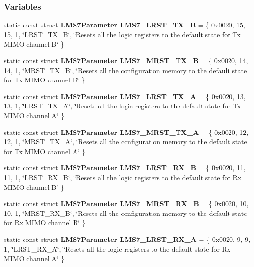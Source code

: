 \subsubsection*{Variables}
\begin{DoxyCompactItemize}
\item 
static const struct {\bf L\+M\+S7\+Parameter} {\bf L\+M\+S7\+\_\+\+L\+R\+S\+T\+\_\+\+T\+X\+\_\+B} = \{ 0x0020, 15, 15, 1, \char`\"{}\+L\+R\+S\+T\+\_\+\+T\+X\+\_\+\+B\char`\"{}, \char`\"{}\+Resets all the logic registers to the default state for Tx M\+I\+M\+O channel B\char`\"{} \}
\item 
static const struct {\bf L\+M\+S7\+Parameter} {\bf L\+M\+S7\+\_\+\+M\+R\+S\+T\+\_\+\+T\+X\+\_\+B} = \{ 0x0020, 14, 14, 1, \char`\"{}\+M\+R\+S\+T\+\_\+\+T\+X\+\_\+\+B\char`\"{}, \char`\"{}\+Resets all the configuration memory to the default state for Tx M\+I\+M\+O channel B\char`\"{} \}
\item 
static const struct {\bf L\+M\+S7\+Parameter} {\bf L\+M\+S7\+\_\+\+L\+R\+S\+T\+\_\+\+T\+X\+\_\+A} = \{ 0x0020, 13, 13, 1, \char`\"{}\+L\+R\+S\+T\+\_\+\+T\+X\+\_\+\+A\char`\"{}, \char`\"{}\+Resets all the logic registers to the default state for Tx M\+I\+M\+O channel A\char`\"{} \}
\item 
static const struct {\bf L\+M\+S7\+Parameter} {\bf L\+M\+S7\+\_\+\+M\+R\+S\+T\+\_\+\+T\+X\+\_\+A} = \{ 0x0020, 12, 12, 1, \char`\"{}\+M\+R\+S\+T\+\_\+\+T\+X\+\_\+\+A\char`\"{}, \char`\"{}\+Resets all the configuration memory to the default state for Tx M\+I\+M\+O channel A\char`\"{} \}
\item 
static const struct {\bf L\+M\+S7\+Parameter} {\bf L\+M\+S7\+\_\+\+L\+R\+S\+T\+\_\+\+R\+X\+\_\+B} = \{ 0x0020, 11, 11, 1, \char`\"{}\+L\+R\+S\+T\+\_\+\+R\+X\+\_\+\+B\char`\"{}, \char`\"{}\+Resets all the logic registers to the default state for Rx M\+I\+M\+O channel B\char`\"{} \}
\item 
static const struct {\bf L\+M\+S7\+Parameter} {\bf L\+M\+S7\+\_\+\+M\+R\+S\+T\+\_\+\+R\+X\+\_\+B} = \{ 0x0020, 10, 10, 1, \char`\"{}\+M\+R\+S\+T\+\_\+\+R\+X\+\_\+\+B\char`\"{}, \char`\"{}\+Resets all the configuration memory to the default state for Rx M\+I\+M\+O channel B\char`\"{} \}
\item 
static const struct {\bf L\+M\+S7\+Parameter} {\bf L\+M\+S7\+\_\+\+L\+R\+S\+T\+\_\+\+R\+X\+\_\+A} = \{ 0x0020, 9, 9, 1, \char`\"{}\+L\+R\+S\+T\+\_\+\+R\+X\+\_\+\+A\char`\"{}, \char`\"{}\+Resets all the logic registers to the default state for Rx M\+I\+M\+O channel A\char`\"{} \}
\item 

\end{DoxyCompactItemize}
